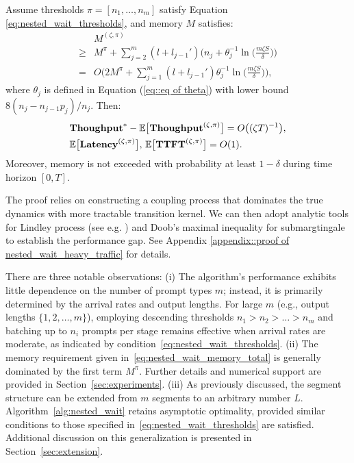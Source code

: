 \begin{theorem}
\label{thm:nested_wait_heavy_traffic}
Assume thresholds \( \pi = [n_1, \dots, n_m] \) satisfy Equation \eqref{eq:nested_wait_thresholds}, and memory \( M \) satisfies:
\begin{equation}
    \label{eq:nested_wait_memory_total}
\begin{aligned}
    &M^{(\zeta,\pi)}\\
\geq &M^\pi + \sum_{j=2}^m (l + l_{j-1}') \bigg(n_j + \theta_j^{-1} \ln\Big( \frac{m \zeta S}{\delta} \Big)\bigg) \\
=& O\bigg( 2M^\pi + \sum_{j=1}^m (l + l_{j-1}') \theta_j^{-1}\ln\Big( \frac{m \zeta S}{\delta} \Big) \bigg),
\end{aligned}
\end{equation}
where \( \theta_j \) is defined in Equation (\ref{eq::eq of theta}) with lower bound $8(n_j-n_{j-1}p_j)/n_j.$ Then:
$$
    \begin{aligned}
        &\textbf{Thoughput}^* - \mathbb{E}\big[ \textbf{Thoughput}^{(\zeta, \pi)} \big] 
   = O\big( (\zeta T)^{-1} \big), \\
&\mathbb{E}\big[ \textbf{Latency}^{(\zeta, \pi)} \big],\,\mathbb{E}\big[ \textbf{TTFT}^{(\zeta, \pi)} \big] = O(1).
    \end{aligned}
$$
Moreover, memory is not exceeded with probability at least \( 1 - \delta \) during time horizon $[0,T].$
\end{theorem}

The proof relies on constructing a coupling process that dominates the true dynamics with more tractable transition kernel. We can then adopt analytic tools for Lindley process (see e.g. \cite{hill1982comparisons}) and Doob's maximal inequality for submargtingale to establish the performance gap. See Appendix \ref{appendix::proof of nested_wait_heavy_traffic} for details.

There are three notable observations: (i) The algorithm's performance exhibits little dependence on the number of prompt types \( m \); instead, it is primarily determined by the arrival rates and output lengths. For large \( m \) (e.g., output lengths \( \{1, 2, \dots, m\} \)), employing descending thresholds \( n_1 > n_2 > \dots > n_m \) and batching up to \( n_i \) prompts per stage remains effective when arrival rates are moderate, as indicated by condition~\eqref{eq:nested_wait_thresholds}. (ii) The memory requirement given in~\eqref{eq:nested_wait_memory_total} is generally dominated by the first term \( M^\pi \). Further details and numerical support are provided in Section~\ref{sec:experiments}. (iii) As previously discussed, the segment structure can be extended from \( m \) segments to an arbitrary number \( L \). Algorithm~\ref{alg:nested_wait} retains asymptotic optimality, provided similar conditions to those specified in~\eqref{eq:nested_wait_thresholds} are satisfied. Additional discussion on this generalization is presented in Section~\ref{sec:extension}.